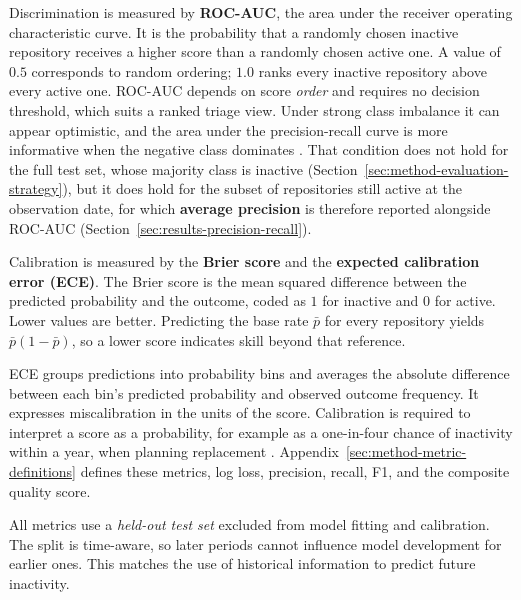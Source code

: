 Discrimination is measured by \textbf{ROC-AUC}, the area under the receiver
operating characteristic curve. It is the probability that a randomly chosen
inactive repository receives a higher score than a randomly chosen active one.
A value of \(0.5\) corresponds to random ordering; \(1.0\) ranks every inactive
repository above every active one. ROC-AUC depends on score \emph{order} and requires no
decision threshold, which suits a ranked triage view. Under strong class
imbalance it can appear optimistic, and the area under the precision-recall curve
is more informative when the negative class dominates
\cite{saito2015precision}. That condition does not hold for the full test set,
whose majority class is inactive
(Section~\ref{sec:method-evaluation-strategy}), but it does hold for the subset of
repositories still active at the observation date, for which
\textbf{average precision} is therefore reported alongside ROC-AUC
(Section~\ref{sec:results-precision-recall}).

Calibration is measured by the \textbf{Brier score} and the \textbf{expected
calibration error (ECE)}. The Brier score is the mean squared difference between
the predicted probability and the outcome, coded as \(1\) for inactive and \(0\)
for active. Lower values are better. Predicting the base rate \(\bar{p}\) for
every repository yields \(\bar{p}(1-\bar{p})\), so a lower score indicates skill
beyond that reference.

ECE groups predictions into probability bins and averages the absolute
difference between each bin's predicted probability and observed outcome
frequency. It expresses
miscalibration in the units of the score. Calibration is required to interpret a
score as a probability, for example as a one-in-four chance of inactivity within
a year, when planning replacement \cite{niculescu2005probabilities}. Appendix~\ref{sec:method-metric-definitions}
defines these metrics, log loss, precision, recall, F1, and the composite quality
score.

All metrics use a \emph{held-out test set} excluded from model fitting and
calibration. The split is time-aware, so later periods cannot influence model
development for earlier ones. This matches the use of historical information to
predict future inactivity.
